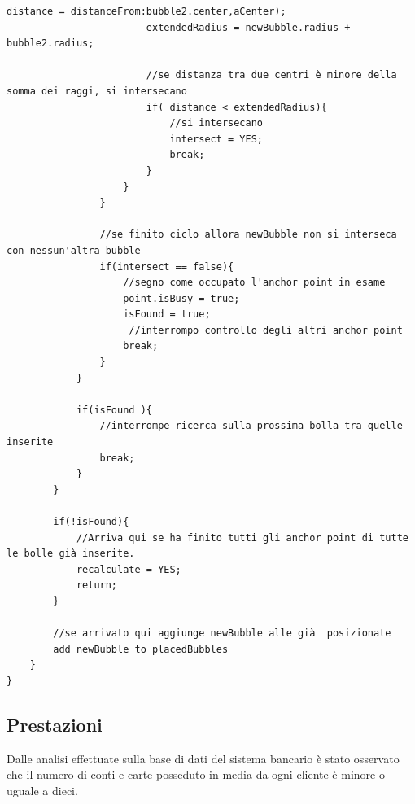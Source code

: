 \begin{lstlisting}[label=algo:3,caption=calculateOriginForBubbles,breaklines=true,  commentstyle=\color{CadetBlue}]
                        distance = distanceFrom:bubble2.center,aCenter);
                        extendedRadius = newBubble.radius + bubble2.radius;

                        //se distanza tra due centri è minore della somma dei raggi, si intersecano
                        if( distance < extendedRadius){
                            //si intersecano
                            intersect = YES;
                            break;
                        }
                    }
                }
                
                //se finito ciclo allora newBubble non si interseca con nessun'altra bubble
                if(intersect == false){
                    //segno come occupato l'anchor point in esame
                    point.isBusy = true;
                    isFound = true;
                     //interrompo controllo degli altri anchor point
                    break;
                }
            }

            if(isFound ){
                //interrompe ricerca sulla prossima bolla tra quelle inserite
                break;
            }
        }

        if(!isFound){
            //Arriva qui se ha finito tutti gli anchor point di tutte le bolle già inserite.
            recalculate = YES;
            return;
        }

        //se arrivato qui aggiunge newBubble alle già  posizionate
        add newBubble to placedBubbles
    }
}
\end{lstlisting}


\subsection{Prestazioni}
Dalle analisi effettuate sulla base di dati del sistema bancario è stato osservato che il numero di conti e carte posseduto in media da ogni cliente è minore o uguale a dieci.

